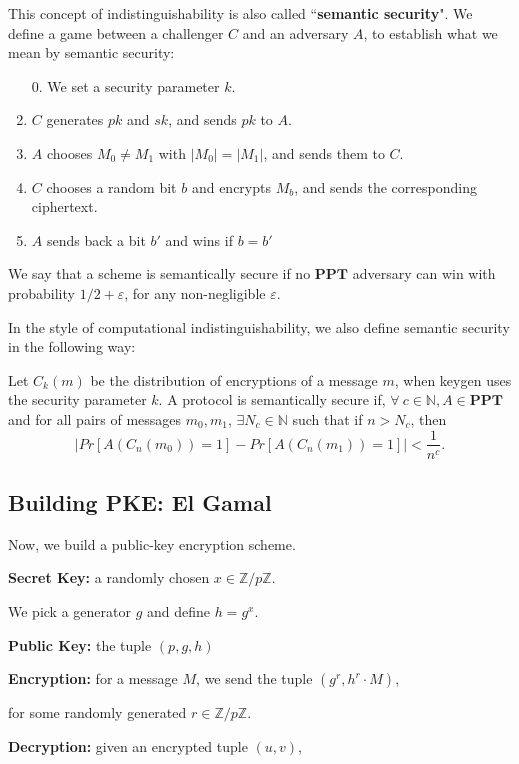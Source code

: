 \documentclass[11pt]{article}
\newcommand{\PPT}{\mathbf{PPT}}
\newcommand{\N}{\mathbb{N}}
\newcommand{\Z}{\mathbb{Z}}
\begin{document}
This concept of indistinguishability is also called ``\textbf{semantic security}".
We define a game between a challenger \(C\) and an adversary \(A\), to establish what we mean by semantic security:

\begin{enumerate}
\item [0.] We set a security parameter \(k\).
\item \(C\) generates \(pk\) and \(sk\), and sends \(pk\) to \(A\).
\item \(A\) chooses \(M_0\ne M_1\) with \(|M_0|=|M_1|\), and sends them to \(C\).
\item \(C\) chooses a random bit \(b\) and encrypts \(M_b\), and sends the corresponding ciphertext.
\item \(A\) sends back a bit \(b'\) and wins if \(b=b'\)
\end{enumerate}

We say that a scheme is semantically secure if no \(\PPT\) adversary can win with probability \(1/2+\varepsilon\), for any non-negligible \(\varepsilon\).\medskip

In the style of computational indistinguishability, we also define semantic security in the following way:\smallskip

Let \(C_k(m)\) be the distribution of encryptions of a message \(m\), when keygen uses the security parameter \(k\). 
A protocol is semantically secure if, \(\forall\: c\in\N, A\in\PPT\) and for all pairs of messages \(m_0,m_1\), \(\exists N_c\in\N\) such that if \(n>N_c\), then
\[|Pr[A(C_n(m_0))=1]-Pr[A(C_n(m_1))=1]|<\frac{1}{n^c}.\]


\subsection{Building PKE: El Gamal}

Now, we build a public-key encryption scheme.\bigskip

\textbf{Secret Key:} a randomly chosen \(x\in\Z/p\Z\).

We pick a generator \(g\) and define \(h=g^x\).\smallskip

\textbf{Public Key:} the tuple \((p,g,h)\)\medskip

\textbf{Encryption:} for a message \(M\), we send the tuple \((g^r, h^r\cdot M)\), 

for some randomly generated \(r\in\Z/p\Z\).\smallskip

\textbf{Decryption:} given an encrypted tuple \((u,v)\), 
\end{document}
